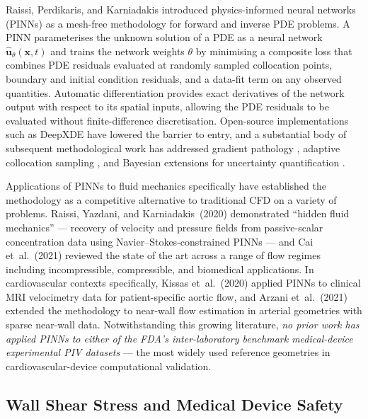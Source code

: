 \documentclass[12pt,a4paper]{article}
\begin{document}
Raissi, Perdikaris, and Karniadakis
\cite{Raissi2019PINN1, Raissi2019PINN2} introduced
physics-informed neural networks (PINNs) as a mesh-free
methodology for forward and inverse PDE problems. A PINN
parameterises the unknown solution of a PDE as a neural network
$\hat{\bm{u}}_\theta(\bm{x}, t)$ and trains the network weights
$\theta$ by minimising a composite loss that combines PDE
residuals evaluated at randomly sampled collocation points,
boundary and initial condition residuals, and a data-fit term
on any observed quantities. Automatic differentiation
\cite{Baydin2018AutoDiff} provides exact derivatives of the
network output with respect to its spatial inputs, allowing the
PDE residuals to be evaluated without finite-difference
discretisation. Open-source implementations such as DeepXDE
\cite{Lu2021DeepXDE} have lowered the barrier to entry, and a
substantial body of subsequent methodological work has
addressed gradient pathology
\cite{Wang2021GradientPath}, adaptive collocation sampling
\cite{Wu2023RAR}, and Bayesian extensions for uncertainty
quantification \cite{Yang2021BayesPINN}.

Applications of PINNs to fluid mechanics specifically have
established the methodology as a competitive alternative to
traditional CFD on a variety of problems. Raissi, Yazdani, and
Karniadakis~(2020) \cite{Raissi2020HFM} demonstrated ``hidden
fluid mechanics'' --- recovery of velocity and pressure fields
from passive-scalar concentration data using
Navier--Stokes-constrained PINNs --- and Cai et~al.~(2021)
\cite{Cai2021FluidPINN} reviewed the state of the art across a
range of flow regimes including incompressible, compressible,
and biomedical applications. In cardiovascular contexts
specifically, Kissas et~al.~(2020) \cite{Kissas2020CardiacPINN}
applied PINNs to clinical MRI velocimetry data for
patient-specific aortic flow, and Arzani et~al.~(2021)
\cite{Arzani2021PINN_Blood} extended the methodology to
near-wall flow estimation in arterial geometries with sparse
near-wall data. Notwithstanding this growing literature,
\emph{no prior work has applied PINNs to either of the FDA's
inter-laboratory benchmark medical-device experimental PIV
datasets} --- the most widely used reference geometries in
cardiovascular-device computational validation.

\subsection{Wall Shear Stress and Medical Device Safety}
\label{sec:wss_background}
\end{document}
